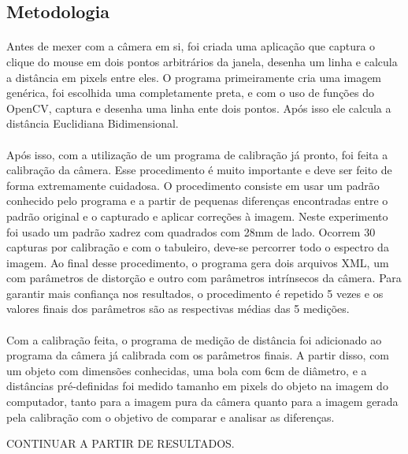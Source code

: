 \documentclass{article}
\begin{document}
		\subsection{Metodologia}
			\paragraph{}
			Antes de mexer com a câmera em si, foi criada uma aplicação que captura o clique do mouse em dois pontos arbitrários da janela, desenha um linha e calcula a distância em pixels entre eles. O programa primeiramente cria uma imagem genérica, foi escolhida uma completamente preta, e com o uso de funções do OpenCV, captura e desenha uma linha ente dois pontos. Após isso ele calcula a distância Euclidiana Bidimensional.
			\paragraph{}
			Após isso, com a utilização de um programa de calibração já pronto, foi feita a calibração da câmera. Esse procedimento é muito importante e deve ser feito de forma extremamente cuidadosa. O procedimento consiste em usar um padrão conhecido pelo programa e a partir de pequenas diferenças encontradas entre o padrão original e o capturado e aplicar correções à imagem. Neste experimento foi usado um padrão xadrez com quadrados com 28mm de lado. Ocorrem 30 capturas por calibração e com o tabuleiro, deve-se percorrer todo o espectro da imagem. Ao final desse procedimento, o programa gera dois arquivos XML, um com parâmetros de distorção e outro com parâmetros intrínsecos da câmera. Para garantir mais confiança nos resultados, o procedimento é repetido 5 vezes e os valores finais dos parâmetros são as respectivas médias das 5 medições.
			\paragraph{}
			Com a calibração feita, o programa de medição de distância foi adicionado ao programa da câmera já calibrada com os parâmetros finais. A partir disso, com um objeto com dimensões conhecidas, uma bola com 6cm de diâmetro, e a distâncias pré-definidas foi medido tamanho em pixels do objeto na imagem do computador, tanto para a imagem pura da câmera quanto para a imagem gerada pela calibração com o objetivo de comparar e analisar as diferenças.

			CONTINUAR A PARTIR DE RESULTADOS.
\end{document}
